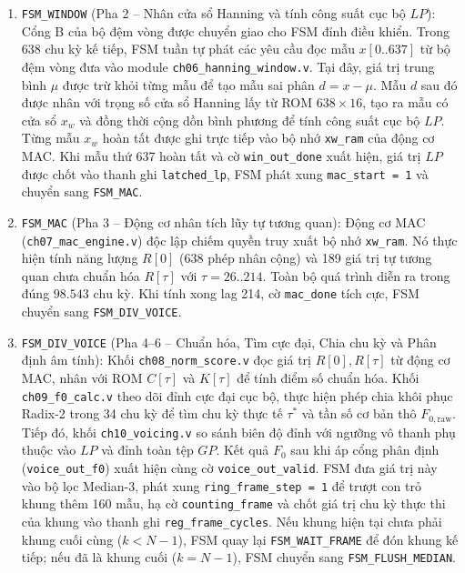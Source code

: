 \begin{enumerate}
    \item \texttt{FSM\_WINDOW} (Pha 2 -- Nhân cửa sổ Hanning và tính công suất cục bộ $LP$): Cổng B của bộ đệm vòng được chuyển giao cho FSM đỉnh điều khiển. Trong 638 chu kỳ kế tiếp, FSM tuần tự phát các yêu cầu đọc mẫu $x[0..637]$ từ bộ đệm vòng đưa vào module \texttt{ch06\_hanning\_window.v}. Tại đây, giá trị trung bình $\mu$ được trừ khỏi từng mẫu để tạo mẫu sai phân $d = x - \mu$. Mẫu $d$ sau đó được nhân với trọng số cửa sổ Hanning lấy từ ROM $638 \times 16$, tạo ra mẫu có cửa sổ $x_w$ và đồng thời cộng dồn bình phương để tính công suất cục bộ $LP$. Từng mẫu $x_w$ hoàn tất được ghi trực tiếp vào bộ nhớ \texttt{xw\_ram} của động cơ MAC. Khi mẫu thứ 637 hoàn tất và cờ \texttt{win\_out\_done} xuất hiện, giá trị $LP$ được chốt vào thanh ghi \texttt{latched\_lp}, FSM phát xung \texttt{mac\_start = 1} và chuyển sang \texttt{FSM\_MAC}.

    \item \texttt{FSM\_MAC} (Pha 3 -- Động cơ nhân tích lũy tự tương quan): Động cơ MAC (\texttt{ch07\_mac\_engine.v}) độc lập chiếm quyền truy xuất bộ nhớ \texttt{xw\_ram}. Nó thực hiện tính năng lượng $R[0]$ (638 phép nhân cộng) và 189 giá trị tự tương quan chưa chuẩn hóa $R[\tau]$ với $\tau = 26..214$. Toàn bộ quá trình diễn ra trong đúng $98.543\text{ chu kỳ}$. Khi tính xong lag 214, cờ \texttt{mac\_done} tích cực, FSM chuyển sang \texttt{FSM\_DIV\_VOICE}.

    \item \texttt{FSM\_DIV\_VOICE} (Pha 4--6 -- Chuẩn hóa, Tìm cực đại, Chia chu kỳ và Phân định âm tính): Khối \texttt{ch08\_norm\_score.v} đọc giá trị $R[0], R[\tau]$ từ động cơ MAC, nhân với ROM $C[\tau]$ và $K[\tau]$ để tính điểm số chuẩn hóa. Khối \texttt{ch09\_f0\_calc.v} theo dõi đỉnh cực đại cục bộ, thực hiện phép chia khôi phục Radix-2 trong 34 chu kỳ để tìm chu kỳ thực tế $\tau^*$ và tần số cơ bản thô $F_{0,\text{raw}}$. Tiếp đó, khối \texttt{ch10\_voicing.v} so sánh biên độ đỉnh với ngưỡng vô thanh phụ thuộc vào $LP$ và đỉnh toàn tệp $GP$. Kết quả $F_0$ sau khi áp cổng phân định (\texttt{voice\_out\_f0}) xuất hiện cùng cờ \texttt{voice\_out\_valid}. FSM đưa giá trị này vào bộ lọc Median-3, phát xung \texttt{ring\_frame\_step = 1} để trượt con trỏ khung thêm 160 mẫu, hạ cờ \texttt{counting\_frame} và chốt giá trị chu kỳ thực thi của khung vào thanh ghi \texttt{reg\_frame\_cycles}. Nếu khung hiện tại chưa phải khung cuối cùng ($k < N - 1$), FSM quay lại \texttt{FSM\_WAIT\_FRAME} để đón khung kế tiếp; nếu đã là khung cuối ($k = N - 1$), FSM chuyển sang \texttt{FSM\_FLUSH\_MEDIAN}.


\end{enumerate}
